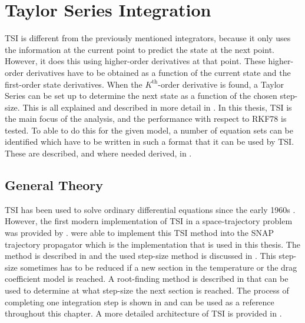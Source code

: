 \chapter{Taylor Series Integration} 

\label{ch:tsi}
\acf{TSI} is different from the previously mentioned integrators, because it only uses the information at the current point to predict the state at the next point. However, it does this using higher-order derivatives at that point. These higher-order derivatives have to be obtained as a function of the current state and the first-order state derivatives. When the $K^{\text{th}}$-order derivative is found, a Taylor Series can be set up to determine the next state as a function of the chosen step-size. This is all explained and described in more detail in . In this thesis, \ac{TSI} is the main focus of the analysis, and the performance with respect to \ac{RKF78} is tested. To able to do this for the given model, a number of equation sets can be identified which have to be written in such a format that it can be used by \ac{TSI}. These are described, and where needed derived, in .

\section{General Theory}
\label{sec:genTsiTheory}
\ac{TSI} has been used to solve ordinary differential equations since the early 1960s \citep{scott2008high}. However, the first modern implementation of \ac{TSI} in a space-trajectory problem was provided by \cite{montenbruck1992numerical}. \cite{scott2008high} were able to implement this \ac{TSI} method into the SNAP trajectory propagator which is the implementation that is used in this thesis. The method is described in  and the used step-size method is discussed in . This step-size sometimes has to be reduced if a new section in the temperature or the drag coefficient model is reached. A root-finding method is described in  that can be used to determine at what step-size the next section is reached. The process of completing one integration step is shown in  and can be used as a reference throughout this chapter. A more detailed architecture of \ac{TSI} is provided in .




